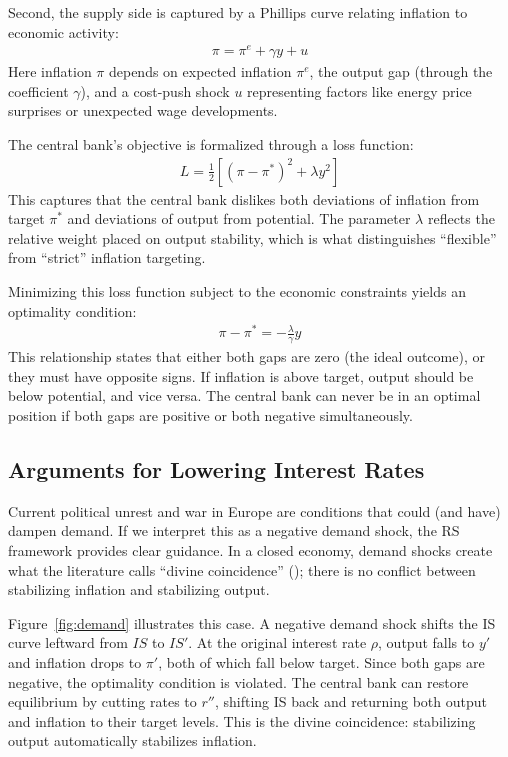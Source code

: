 \documentclass[10pt]{article}
\begin{document}
Second, the supply side is captured by a Phillips curve relating inflation to economic activity: 
\begin{gather*}
    \pi = \pi^e + \gamma y + u
\end{gather*}
Here inflation $\pi $ depends on expected inflation $\pi^e $, the output gap (through the coefficient $\gamma $), and a cost-push shock $u $ representing factors like energy price surprises or unexpected wage developments.

The central bank's objective is formalized through a loss function: 
\begin{gather*}
    L = \frac{1}{2}\left[(\pi - \pi^*)^2 + \lambda y^2\right]
\end{gather*}
This captures that the central bank dislikes both deviations of inflation from target $\pi^* $ and deviations of output from potential. The parameter $\lambda $ reflects the relative weight placed on output stability, which is what distinguishes ``flexible'' from ``strict'' inflation targeting.

Minimizing this loss function subject to the economic constraints yields an optimality condition: 
\begin{gather*}
    \pi - \pi^* = -\frac{\lambda}{\gamma}y
\end{gather*}
This relationship states that either both gaps are zero (the ideal outcome), or they must have opposite signs. If inflation is above target, output should be below potential, and vice versa. The central bank can never be in an optimal position if both gaps are positive or both negative simultaneously.

\subsection{Arguments for Lowering Interest Rates}

Current political unrest and war in Europe are conditions that could (and have) dampen demand. If we interpret this as a negative demand shock, the RS framework provides clear guidance. In a closed economy, demand shocks create what the literature calls ``divine coincidence'' (\cite{87e157cf-0c39-3c03-80d6-6ece5bed6979}); there is no conflict between stabilizing inflation and stabilizing output. 

Figure~\ref{fig:demand} illustrates this case. A negative demand shock shifts the IS curve leftward from $IS$ to $IS'$. At the original interest rate $\rho$, output falls to $y'$ and inflation drops to $\pi'$, both of which fall below target. Since both gaps are negative, the optimality condition is violated. The central bank can restore equilibrium by cutting rates to $r''$, shifting IS back and returning both output and inflation to their target levels. This is the divine coincidence: stabilizing output automatically stabilizes inflation.
\end{document}

